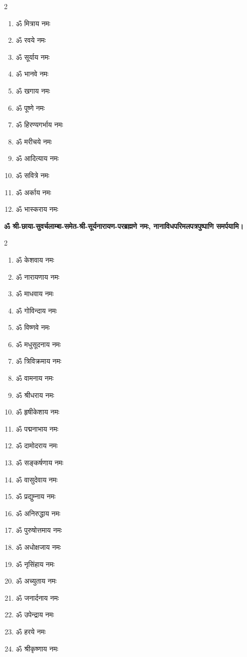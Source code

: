 \begin{center}
\begin{multicols}{2}
\begin{enumerate}
\item ॐ मित्राय नमः
\item ॐ रवये नमः
\item ॐ सूर्याय नमः
\item ॐ भानवे नमः
\item ॐ खगाय नमः
\item ॐ पूष्णे नमः
\item ॐ हिरण्यगर्भाय नमः
\item ॐ मरीचये नमः
\item ॐ आदित्याय नमः
\item ॐ सवित्रे नमः
\item ॐ अर्काय नमः
\item ॐ भास्कराय नमः

\end{enumerate}
\end{multicols}
\textbf{ॐ श्री-छाया-सुवर्चलाम्बा-समेत-श्री-सूर्यनारायण-परब्रह्मणे नमः, नानाविधपरिमलपत्रपुष्पाणि समर्पयामि।} \medskip


\begin{multicols}{2}
\begin{enumerate}
\item ॐ केशवाय नमः
\item ॐ नारायणाय नमः
\item ॐ माधवाय नमः
\item ॐ गोविन्दाय नमः
\item ॐ विष्णवे नमः	
\item ॐ मधुसूदनाय नमः
\item ॐ त्रिविक्रमाय नमः
\item ॐ वामनाय नमः
\item ॐ श्रीधराय नमः
\item ॐ हृषीकेशाय नमः
\item ॐ पद्मनाभाय नमः
\item ॐ दामोदराय नमः
\item ॐ सङ्कर्षणाय नमः
\item ॐ वासुदेवाय नमः
\item ॐ प्रद्युम्नाय नमः
\item ॐ अनिरुद्धाय नमः
\item ॐ पुरुषोत्तमाय नमः
\item ॐ अधोक्षजाय नमः
\item ॐ नृसिंहाय नमः
\item ॐ अच्युताय नमः
\item ॐ जनार्दनाय नमः
\item ॐ उपेन्द्राय नमः
\item ॐ हरये नमः
\item ॐ श्रीकृष्णाय नमः
\end{enumerate}
\end{multicols}


\end{center}
